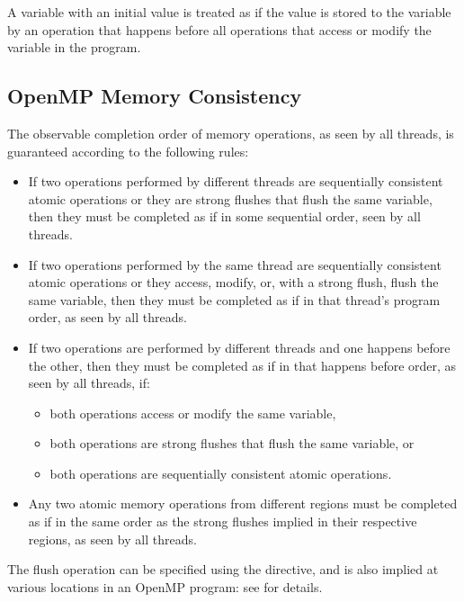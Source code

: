 A variable with an initial value is treated as if the value is stored to the
variable by an operation that happens before all operations that access or
modify the variable in the program.

\subsection{OpenMP Memory Consistency}
\label{subsec:OpenMP Memory Consistency}

The observable completion order of memory operations, as seen by all threads, is
guaranteed according to the following rules:

\begin{itemize}
\item If two operations performed by different threads are sequentially
    consistent atomic operations or they are strong flushes that flush the
    same variable, then they must be completed as if in some sequential order,
    seen by all threads.

\item If two operations performed by the same thread are sequentially
    consistent atomic operations or they access, modify, or, with a strong
    flush, flush the same variable, then they must be completed as if in that
    thread's program order, as seen by all threads.

\item If two operations are performed by different threads and one happens
    before the other, then they must be completed as if in that happens before
    order, as seen by all threads, if:
    \begin{itemize}
        \item both operations access or modify the same variable,
        \item both operations are strong flushes that flush the same variable, or
        \item both operations are sequentially consistent atomic operations.
    \end{itemize}

\item Any two atomic memory operations from different  regions
    must be completed as if in the same order as the strong flushes
    implied in their respective regions, as seen by all threads.
\end{itemize}

The flush operation can be specified using the  directive, and is also implied at
various locations in an OpenMP program: see  for details.

